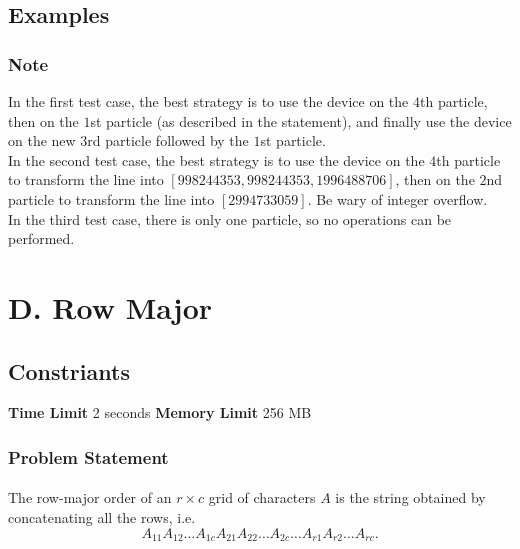 \documentclass{article}
\begin{document}
\subsection*{Examples}
\subsubsection*{Note}In the first test case, the best strategy is to use the device on the $4$th particle, then on the $1$st particle (as described in the statement), and finally use the device on the new $3$rd particle followed by the $1$st particle.\\ In the second test case, the best strategy is to use the device on the $4$th particle to transform the line into $[998244353,998244353,1996488706]$, then on the $2$nd particle to transform the line into $[2994733059]$. Be wary of integer overflow.\\ In the third test case, there is only one particle, so no operations can be performed.
\newpage
\section*{D. Row Major}
\subsection*{Constriants}
\textbf{Time Limit}
2 seconds
\hfill
\textbf{Memory Limit}
256 MB
\subsubsection*{Problem Statement}
\paragraph{}The row-major order of an $r \times c$ grid of characters $A$ is the string obtained by concatenating all the rows, i.e. $$ A_{11}A_{12} \dots A_{1c}A_{21}A_{22} \dots A_{2c} \dots A_{r1}A_{r2} \dots A_{rc}. $$
\end{document}
